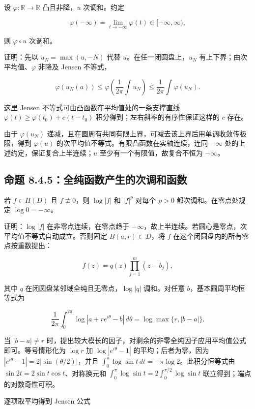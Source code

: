 \documentclass[11pt,a4paper]{article}
\begin{document}
设 \(\varphi:\mathbb R\to\mathbb R\) 凸且非降，\(u\) 次调和。约定

\[
\varphi(-\infty)=\lim_{t\to-\infty}\varphi(t)\in[-\infty,\infty),
\]

则 \(\varphi\circ u\) 次调和。

证明：先以 \(u_N=\max(u,-N)\) 代替 \(u\)。在任一闭圆盘上，\(u_N\)
有上下界；由次平均值、\(\varphi\) 非降及 Jensen 不等式，

\[
\varphi(u_N(a))\le\varphi\left(\frac1{2\pi}\int u_N\right)
\le\frac1{2\pi}\int\varphi(u_N).\tag{8.4.E}
\]

这里 Jensen 不等式可由凸函数在平均值处的一条支撑直线
\(\varphi(t)\ge\varphi(t_0)+c(t-t_0)\)
积分得到；左右斜率的有序性保证这样的 \(c\) 存在。

由于 \(\varphi(u_N)\)
递减，且在圆周有共同有限上界，可减去该上界后用单调收敛传极限，得到
\(\varphi(u)\) 的次平均值不等式。有限凸函数在实轴连续，连同 \(-\infty\)
处的上述约定，保证复合上半连续；\(u\) 至少有一个有限值，故复合不恒为
\(-\infty\)。

\subsection{命题 8.4.5：全纯函数产生的次调和函数}\label{ch08-s4-heading-6}

若 \(f\in H(D)\) 且 \(f\not\equiv0\)，则 \(\log|f|\) 和 \(|f|^p\) 对每个
\(p>0\) 都次调和。在零点处规定 \(\log0=-\infty\)。

证明：\(\log|f|\) 在非零点连续，在零点趋于
\(-\infty\)，故上半连续。若圆心是零点，次平均值不等式自动成立。否则固定
\(\overline{B(a,r)}\subset D\)，将 \(f\)
在这个闭圆盘内的所有零点按重数提出：

\[
f(z)=q(z)\prod_{j=1}^m(z-b_j),
\]

其中 \(q\) 在闭圆盘某邻域全纯且无零点，\(\log|q|\) 调和。对任意
\(b\)，基本圆周平均恒等式为

\[
\frac1{2\pi}\int_0^{2\pi}\log|a+re^{i\theta}-b|\,d\theta
=\log\max\{r,|b-a|\}.\tag{8.4.F}
\]

当 \(|b-a|\ne r\)
时，提出较大模长的因子，对剩余的非零全纯因子应用平均值公式即可。等号情形化为
\(\log r\) 加 \(\log|e^{i\theta}-1|\) 的平均；后者为零，因为
\(|e^{i\theta}-1|=2|\sin(\theta/2)|\)，并且
\(\int_0^\pi\log\sin t\,dt=-\pi\log2\)。此积分恒等式由
\(\sin2t=2\sin t\cos t\)、对称换元和
\(\int_0^\pi\log\sin t=2\int_0^{\pi/2}\log\sin t\)
联立得到；端点的对数奇性可积。

逐项取平均得到 Jensen 公式
\end{document}

